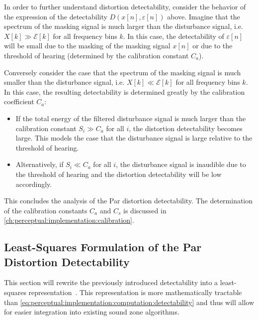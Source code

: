 In order to further understand distortion detectability, consider the behavior of the expression of the 
detectability $D(x[n],\varepsilon[n])$ above.
Imagine that the spectrum of the masking signal is much larger than the disturbance signal, 
i.e. $X[k] \gg \mathcal{E}[k]$ for all frequency bins $k$.
In this case, the detectability of $\varepsilon[n]$ will be small due to the masking of the masking signal $x[n]$ or
due to the threshold of hearing (determined by the calibration constant $C_a$).

Conversely consider the case that the spectrum of the masking signal is much smaller than the disturbance signal,
i.e. $X[k] \ll \mathcal{E}[k]$ for all frequency bins $k$.
In this case, the resulting detectability is determined greatly by the calibration coefficient $C_a$: 
\begin{itemize}
    \item If the total energy of the filtered disturbance signal is much larger than the calibration constant 
        $S_i \gg C_a$ for all $i$, the distortion detectability becomes large.
        This models the case that the disturbance signal is large relative to the threshold of hearing.
    \item Alternatively, if $S_i \ll C_a$ for all $i$, the disturbance signal is 
        inaudible due to the threshold of hearing and the distortion detectability will be low accordingly.
\end{itemize}

This concludes the analysis of the Par distortion detectability.
The determination of the calibration constants $C_a$ and $C_s$ is discussed in \autoref{ch:perceptual:implementation:calibration}.


\subsection{Least-Squares Formulation of the Par Distortion Detectability}
\label{ch:perceptual:implementation:least_squares}
This section will rewrite the previously introduced detectability into a least-squares representation~\cite{taal2012low}. 
This representation is more mathematically tractable than 
\autoref{eq:perceptual:implementation:computation:detectability} and thus 
will allow for easier integration into existing sound zone algorithms.

